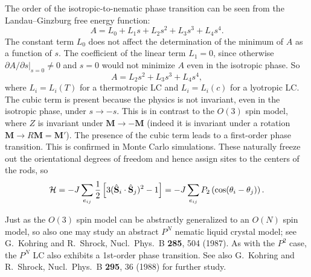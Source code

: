 The order of the isotropic-to-nematic phase transition can be seen from the Landau--Ginzburg free energy function:
\begin{equation}
  A = L_0 + L_1s + L_2s^2 + L_3s^3 + L_4s^4 .
\end{equation}
The constant term $L_0$ does not affect the determination of the minimum of $A$ as a function of $s$. The coefficient of
the linear term $L_1 = 0$, since otherwise $\left.\partial A/\partial s\right|_{s=0}\ne 0$ and $s = 0$ would not minimize
$A$ even in the isotropic phase. So
\begin{equation}
  A = L_2s^2 + L_3s^3 + L_4s^4,
\end{equation}
where $L_i = L_i(T)$ for a thermotropic LC and $L_i = L_i(c)$ for a lyotropic LC. The cubic term is present because the
physics is not invariant, even in the isotropic phase, under $s\to-s$. This is in contrast to the $O(3)$ spin model, where
$Z$ is invariant under $\mathbf M\to-\mathbf M$ (indeed it is invariant under a rotation $\mathbf M\to R\mathbf M = \mathbf M'$).
The presence of the cubic term leads to a first-order phase transition. This is confirmed in Monte Carlo simulations.
These naturally freeze out the orientational degrees of freedom and hence assign sites to the centers of the rods, so
\begin{equation}
  \mathcal{H} = -J\sum_{e_{ij}}\frac{1}{2}\left[3(\hat{\mathbf S}_i\cdot\hat{\mathbf S}_j)^2-1\right] = -J\sum_{e_{ij}}P_2\left(\cos(\theta_i-\theta_j)\right).
\end{equation}

\begin{diagram}
\end{diagram}

Just as the $O(3)$ spin model can be abstractly generalized to an $O(N)$ spin model, so also one may study an abstract
$P^N$ nematic liquid crystal model; see G.~Kohring and R.~Shrock, Nucl.\ Phys.\ B \textbf{285}, 504 (1987). As with the
$P^2$ case, the $P^N$ LC also exhibits a 1st-order phase transition. See also G.~Kohring and R.~Shrock, Nucl.\ Phys.\ B
\textbf{295}, 36 (1988) for further study.

